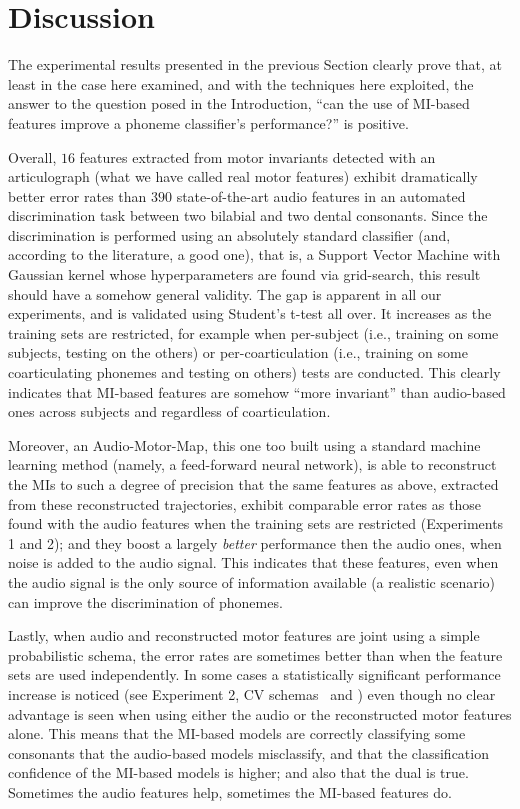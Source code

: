 \section{Discussion}
\label{sec:disc}

The experimental results presented in the previous Section clearly prove that,
at least in the case here examined, and with the techniques here exploited,
the answer to the question posed in the Introduction, ``can the use of MI-based
features improve a phoneme classifier's performance?'' is positive.

Overall, $16$ features extracted from motor invariants detected with an articulograph
(what we have called real motor features) exhibit dramatically better error rates
than $390$ state-of-the-art audio features in an automated discrimination task between
two bilabial and two dental consonants. Since the discrimination is performed using an
absolutely standard classifier (and, according to the literature, a good one), that is,
a Support Vector Machine with Gaussian kernel whose hyperparameters are found via
grid-search, this result should have a somehow general validity.
The gap is apparent in all our experiments, and is validated using Student's
t-test all over. It increases as the training sets are restricted, for example
when per-subject (i.e., training on some subjects, testing on the others) or
per-coarticulation (i.e., training on some coarticulating phonemes and testing on
others) tests are conducted. This clearly indicates that MI-based features are
somehow ``more invariant'' than audio-based ones across subjects and regardless
of coarticulation.

Moreover, an Audio-Motor-Map, this one too built using a standard machine learning
method (namely, a feed-forward neural network), is able to reconstruct the MIs
to such a degree of precision that the same features as above, extracted from these
reconstructed trajectories, exhibit comparable error rates as those found with the
audio features when the training sets are restricted (Experiments 1 and 2); and they
boost a largely \emph{better} performance then the audio ones, when noise is added
to the audio signal. This indicates that these features, even when the audio signal
is the only source of information available (a realistic scenario) can improve the
discrimination of phonemes.

Lastly, when audio and reconstructed motor features are joint
using a simple probabilistic schema, the error rates are sometimes better than when
the feature sets are used independently. In some cases a statistically significant
performance increase is noticed (see Experiment 2, CV schemas \spkb\ and \spkc)
even though no clear advantage is seen when using either the audio or the
reconstructed motor features alone. This means that the MI-based models are
correctly classifying some consonants that the audio-based models misclassify,
and that the classification confidence of the MI-based models is higher; and
also that the dual is true. Sometimes the audio features help, sometimes the MI-based
features do.




